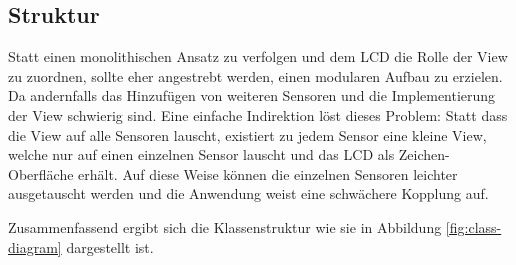 \documentclass[
    10pt,
    a4paper,
]{scrartcl}
\begin{document}
\subsection{Struktur}


Statt einen monolithischen Ansatz zu verfolgen und dem LCD die Rolle der View zu
zuordnen, sollte eher angestrebt werden, einen modularen Aufbau zu erzielen. Da
andernfalls das Hinzufügen von weiteren Sensoren und die Implementierung der View
schwierig sind. Eine einfache Indirektion löst dieses Problem: Statt dass die View auf
alle Sensoren lauscht, existiert zu jedem Sensor eine kleine View, welche nur auf einen
einzelnen Sensor lauscht und das LCD als Zeichen-Oberfläche erhält. Auf diese Weise können
die einzelnen Sensoren leichter ausgetauscht werden und die Anwendung weist eine
schwächere Kopplung auf.

Zusammenfassend ergibt sich die Klassenstruktur wie sie in Abbildung
\ref{fig:class-diagram} dargestellt ist.
\end{document}
